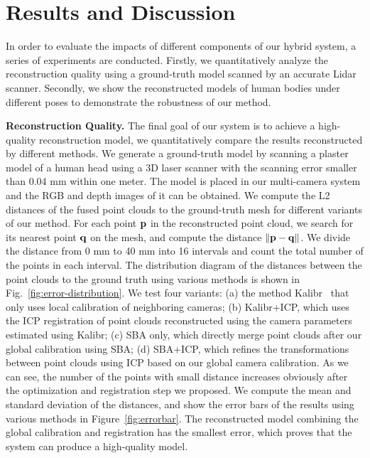 
\section{Results and Discussion}
\label{sec:Results}

In order to evaluate the impacts of different components of our hybrid system, a series of experiments are conducted. Firstly, we quantitatively analyze the reconstruction quality using a ground-truth model scanned by an accurate Lidar scanner.
Secondly, we show the reconstructed models of human bodies under different poses to demonstrate the robustness of our method.




\noindent\textbf{Reconstruction Quality.}
The final goal of our system is to achieve a high-quality reconstruction model, we quantitatively compare the results reconstructed by different methods.
%
We generate a ground-truth model by scanning a plaster model of a human head using a 3D laser scanner with the scanning error smaller than 0.04 mm within one meter.
%
The model is placed in our multi-camera system and the RGB and depth images of it can be obtained.
We compute the L2 distances of the fused point clouds to the ground-truth mesh for different variants of our method.
For each point $\mathbf{p}$ in the reconstructed point cloud, we search for its nearest point $\mathbf{q}$ on the mesh, and compute the distance $\|\mathbf{p}-\mathbf{q}\|$.
%
We divide the distance from 0 mm to 40 mm into 16 intervals and count the total number of the points in each interval. The distribution diagram of the distances between the point clouds to the ground truth using various methods is shown in Fig.~\ref{fig:error-distribution}. 
%
We test four variants: (a) the method Kalibr~\cite{Maye2013Self} that only uses local calibration of neighboring cameras; (b) Kalibr+ICP, which uses the ICP registration of point clouds reconstructed using the camera parameters estimated using Kalibr; (c) SBA only, which directly merge point clouds after our global calibration using SBA; (d) SBA+ICP, which refines the transformations between point clouds using ICP based on our global camera calibration.
%
As we can see, the number of the points with small distance increases obviously after the optimization and registration step we proposed. We compute the mean and standard deviation of the distances, and show the error bars of the results using various methods in Figure~\ref{fig:errorbar}. The reconstructed model combining the global calibration and registration has the smallest error, which proves that the system can produce a high-quality model.



